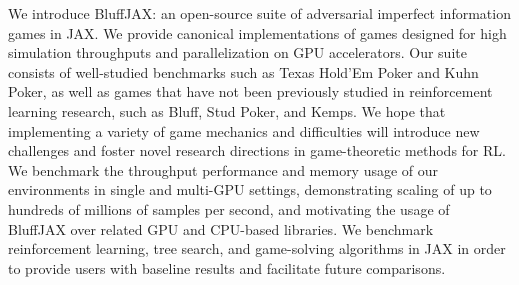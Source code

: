 We introduce BluffJAX: an open-source suite of adversarial imperfect information games in JAX. We provide canonical implementations of games designed for high simulation throughputs and parallelization on GPU accelerators. Our suite consists of well-studied benchmarks such as Texas Hold'Em Poker and Kuhn Poker, as well as games that have not been previously studied in reinforcement learning research, such as Bluff, Stud Poker, and Kemps. We hope that implementing a variety of game mechanics and difficulties will introduce new challenges and foster novel research directions in game-theoretic methods for RL. We benchmark the throughput performance and memory usage of our environments in single and multi-GPU settings, demonstrating scaling of up to hundreds of millions of samples per second, and motivating the usage of BluffJAX over related GPU and CPU-based libraries. We benchmark reinforcement learning, tree search, and game-solving algorithms in JAX in order to provide users with baseline results and facilitate future comparisons.